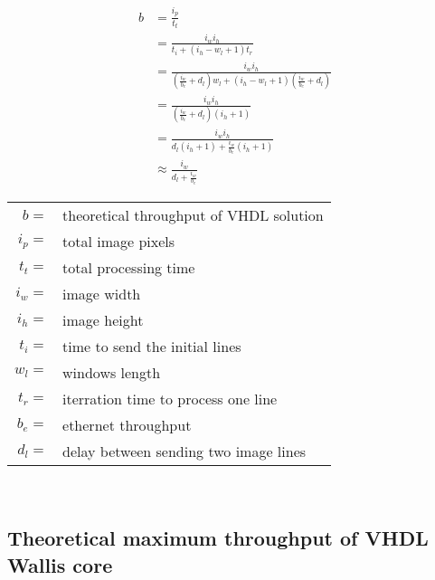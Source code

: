 \begin{align}
    b  & = \frac{i_p}{t_t} \\
       & = \frac{i_w i_h}{t_i+(i_h-w_l+1)t_r} \\
       & = \frac{i_w i_h}{(\frac{i_w}{b_e}+d_l)w_l+(i_h-w_l+1)(\frac{i_w}
       {b_e}+d_l)} \\
       & = \frac{i_w i_h}{(\frac{i_w}{b_e}+d_l)(i_h+1)} \\
       & = \frac{i_w i_h}{d_l(i_h+1)+\frac{i_w}{b_e}(i_h+1)} \\
       & \approx \frac{i_w}{d_l+\frac{i_w}{b_e}}
    \label{eq:theomaxb}
\end{align}
\begin{tabular}{rl}
    $b     =$ & theoretical throughput of VHDL solution \\
    $i_p   =$ & total image pixels \\
    $t_t   =$ & total processing time \\
    $i_w   =$ & image width \\
    $i_h   =$ & image height \\
    $t_i   =$ & time to send the initial lines \\
    $w_l   =$ & windows length \\
    $t_r   =$ & iterration time to process one line \\
    $b_e   =$ & ethernet throughput \\
    $d_l   =$ & delay between sending two image lines \\
\end{tabular} \\

\subsection{Theoretical maximum throughput of VHDL Wallis core} 
\label{app:derivations:theomaxvhdlwallis}

